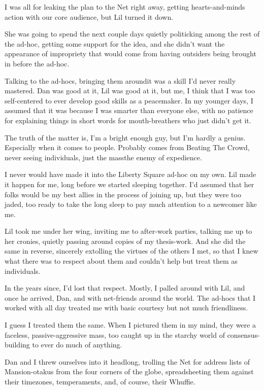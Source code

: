 I was all for leaking the plan to the Net right away, getting
hearts-and-minds action with our core audience, but Lil turned it
down.

She was going to spend the next couple days quietly politicking
among the rest of the ad-hoc, getting some support for the idea,
and she didn't want the appearance of impropriety that would come
from having outsiders being brought in before the ad-hoc.

Talking to the ad-hocs, bringing them around{\dash}it was a skill I'd
never really mastered. Dan was good at it, Lil was good at it, but
me, I think that I was too self-centered to ever develop good
skills as a peacemaker. In my younger days, I assumed that it was
because I was smarter than everyone else, with no patience for
explaining things in short words for mouth-breathers who just
didn't get it.

The truth of the matter is, I'm a bright enough guy, but I'm hardly
a genius. Especially when it comes to people. Probably comes from
Beating The Crowd, never seeing individuals, just the mass{\dash}the
enemy of expedience.

I never would have made it into the Liberty Square ad-hoc on my
own. Lil made it happen for me, long before we started sleeping
together. I'd assumed that her folks would be my best allies in the
process of joining up, but they were too jaded, too ready to take
the long sleep to pay much attention to a newcomer like me.

Lil took me under her wing, inviting me to after-work parties,
talking me up to her cronies, quietly passing around copies of my
thesis-work. And she did the same in reverse, sincerely extolling
the virtues of the others I met, so that I knew what there was to
respect about them and couldn't help but treat them as
individuals.

In the years since, I'd lost that respect. Mostly, I palled around
with Lil, and once he arrived, Dan, and with net-friends around the
world. The ad-hocs that I worked with all day treated me with basic
courtesy but not much friendliness.

I guess I treated them the same. When I pictured them in my mind,
they were a faceless, passive-aggressive mass, too caught up in the
starchy world of consensus-building to ever do much of anything.

Dan and I threw ourselves into it headlong, trolling the Net for
address lists of Mansion-otakus from the four corners of the globe,
spreadsheeting them against their timezones, temperaments, and, of
course, their Whuffie.

